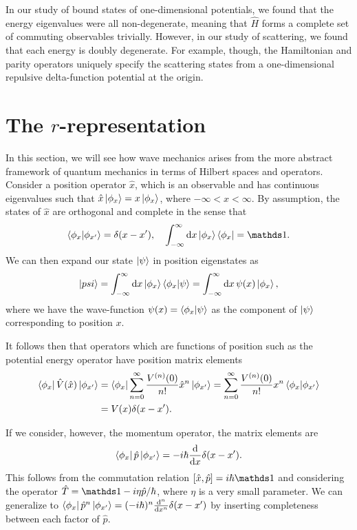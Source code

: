 In our study of bound states of one-dimensional potentials, we found that the energy eigenvalues were all non-degenerate, meaning that $\hat{H}$ forms a complete set of commuting observables trivially.
However, in our study of scattering, we found that each energy is doubly degenerate.
For example, though, the Hamiltonian and parity operators uniquely specify the scattering states from a one-dimensional repulsive delta-function potential at the origin.


\section{The $r$-representation}

In this section, we will see how wave mechanics arises from the more abstract framework of quantum mechanics in terms of Hilbert spaces and operators.
Consider a position operator $\hat{x}$, which is an observable and has continuous eigenvalues such that $\hat{x} \ket{\phi_{x}} = x \ket{\phi_{x}}$, where $-\infty < x < \infty$.
By assumption, the states of $\hat{x}$ are orthogonal and complete in the sense that
\begin{eqnarray}
    \bra{\phi_{x}}\ket{\phi_{x'}} = \delta(x - x'), \quad \int_{-\infty}^{\infty} \dd{x} \ket{\phi_{x}} \bra{\phi_{x}} = \id
.\end{eqnarray}
We can then expand our state $\ket{\psi}$ in position eigenstates as
\begin{eqnarray}
    \ket{psi} = \int_{-\infty}^{\infty} \dd{x} \ket{\phi_{x}} \bra{\phi_{x}}\ket{\psi} = \int_{-\infty}^{\infty} \dd{x} \psi(x) \ket{\phi_{x}}
,\end{eqnarray}
where we have the wave-function $\psi(x) = \bra{\phi_{x}}\ket{\psi}$ as the component of $\ket{\psi}$ corresponding to position $x$.

It follows then that operators which are functions of position such as the potential energy operator have position matrix elements
\begin{align}
    \bra{\phi_{x}} \hat{V}(\hat{x}) \ket{\phi_{x'}} &= \bra{\phi_{x}} \sum_{n=0}^{\infty} \frac{V^{(n)}(0)}{n!} \hat{x}^{n} \ket{\phi_{x'}} = \sum_{n=0}^{\infty} \frac{V^{(n)}(0)}{n!} x^{n} \bra{\phi_{x}} \ket{\phi_{x'}} \nonumber \\
                                                    &= V(x) \delta(x-x')
.\end{align}

If we consider, however, the momentum operator, the matrix elements are
\begin{eqnarray}
    \bra{\phi_{x}} \hat{p} \ket{\phi_{x'}} = -i \hbar \dv{x} \delta(x-x')
.\end{eqnarray}
This follows from the commutation relation $[\hat{x},\hat{p}] = i\hbar \id$ and considering the operator $\hat{T} = \id - i \eta \hat{p} / \hbar$, where $\eta$ is a very small parameter.
We can generalize to $\bra{\phi_{x}} \hat{p}^{n} \ket{\phi_{x'}} = (-i\hbar)^{n} \dv[n]{x} \delta(x-x')$ by inserting completeness between each factor of $\hat{p}$.

